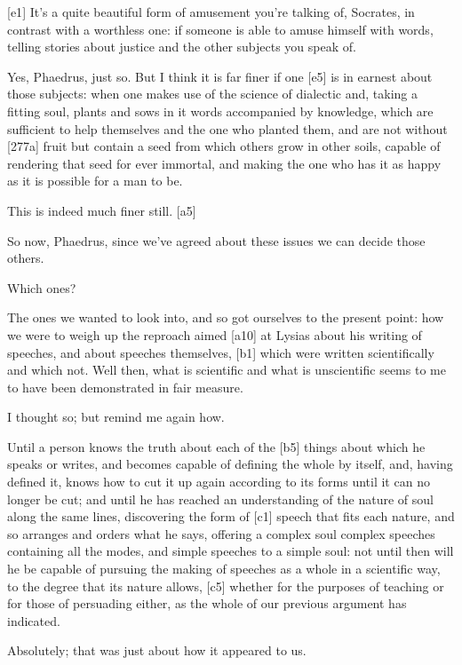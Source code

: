 {[}e1{]}  It's a quite beautiful form of amusement you're
talking of, Socrates, in contrast with a worthless one: if someone is
able to amuse himself with words, telling stories about justice and the
other subjects you speak
of.

 Yes, Phaedrus, just so. But I think it is far finer if one
{[}e5{]} is in earnest about those subjects: when one makes use of the
science of dialectic and, taking a fitting soul, plants and sows in it
words accompanied by knowledge, which are sufficient to help themselves
and the one who planted them, and are not without {[}277a{]} fruit but
contain a seed from which others grow in other soils, capable of
rendering that seed for ever immortal, and making the one who has it as
happy as it is possible for a man to be.

 This is indeed much finer still. {[}a5{]}

 So now, Phaedrus, since we've agreed about these issues we can
decide those others.

 Which ones?

 The ones we wanted to look into, and so got ourselves to the
present point: how we were to weigh up the reproach aimed {[}a10{]} at
Lysias about his writing of speeches, and about speeches themselves,
{[}b1{]} which were written scientifically and which not. Well then,
what is scientific and what is unscientific seems to me to have been
demonstrated in fair measure.

 I thought so; but remind me again how.

 Until a person knows the truth about each of the {[}b5{]}
things about which he speaks or writes, and becomes capable of defining
the whole by itself, and, having defined it, knows how to cut it up
again according to its forms until it can no longer be cut; and until he
has reached an understanding of the nature of soul along the same lines,
discovering the form of {[}c1{]} speech that fits each nature, and so
arranges and orders what he says, offering a
complex soul complex
speeches containing all the modes, and simple speeches to a simple soul:
not until then will he be capable of pursuing the making of speeches as
a whole in a scientific way, to the degree that its nature allows,
{[}c5{]} whether for the purposes of teaching or for those of persuading
either, as the whole of our previous argument has indicated.

 Absolutely; that was just about how it appeared to us.

